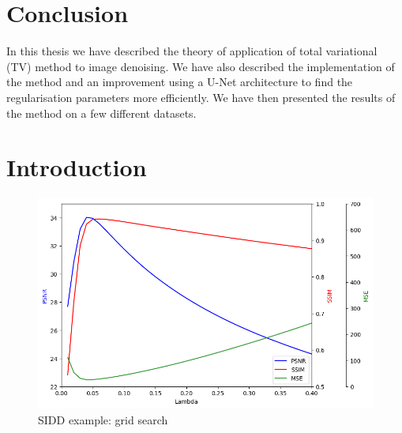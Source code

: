 \documentclass[12pt]{article}
\begin{document}
\section{Conclusion}

In this thesis we have described the theory of application of total variational (TV) method to image denoising.
We have also described the implementation of the method and an improvement using a U-Net architecture to find the regularisation parameters more efficiently.
We have then presented the results of the method on a few different datasets.



\section{Introduction}





\begin{figure}[h]
    \centering
    \includegraphics[width=0.8\linewidth]{100-line_plots.png}
    \caption{SIDD example: grid search}
    \label{fig:enter-label}
\end{figure}
\end{document}
